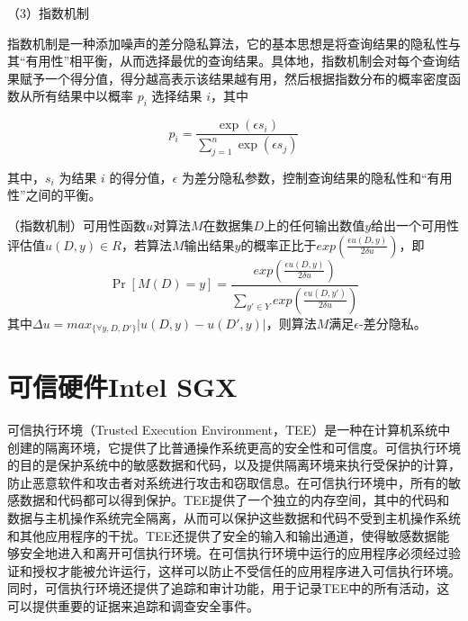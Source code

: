 %
%

（3）指数机制

指数机制是一种添加噪声的差分隐私算法，它的基本思想是将查询结果的隐私性与其“有用性”相平衡，从而选择最优的查询结果。具体地，指数机制会对每个查询结果赋予一个得分值，得分越高表示该结果越有用，然后根据指数分布的概率密度函数从所有结果中以概率 $p_i$ 选择结果 $i$，其中

$$ p_i = \frac{\exp(\epsilon s_i)}{\sum_{j=1}^{n}\exp(\epsilon s_j)} $$

其中，$s_i$ 为结果 $i$ 的得分值，$\epsilon$ 为差分隐私参数，控制查询结果的隐私性和“有用性”之间的平衡。


\begin{theorem}
	（指数机制\cite{mcsherry2007mechanism}）可用性函数$u$对算法$M$在数据集$D$上的任何输出数值$y$给出一个可用性评估值$u(D,y)\in R$，若算法$M$输出结果$y$的概率正比于$exp(\frac{\epsilon u(D,y)}{2\delta u})$，即
	\begin{equation}
		\mathop{Pr}[M(D)=y]=\frac{exp(\frac{\epsilon u(D,y)}{2\delta u})}{\sum_{y'\in Y}exp(\frac{\epsilon u(D,y')}{2\delta u})}
	\end{equation}
其中$\Delta u = max_{\{\forall y, D, D'\}}|u(D,y)-u(D',y)|$，则算法$M$满足$\epsilon$-差分隐私。
\end{theorem}

\section{可信硬件Intel SGX}


可信执行环境（Trusted Execution Environment，TEE）是一种在计算机系统中创建的隔离环境，它提供了比普通操作系统更高的安全性和可信度。可信执行环境的目的是保护系统中的敏感数据和代码，以及提供隔离环境来执行受保护的计算，防止恶意软件和攻击者对系统进行攻击和窃取信息。在可信执行环境中，所有的敏感数据和代码都可以得到保护。TEE提供了一个独立的内存空间，其中的代码和数据与主机操作系统完全隔离，从而可以保护这些数据和代码不受到主机操作系统和其他应用程序的干扰。TEE还提供了安全的输入和输出通道，使得敏感数据能够安全地进入和离开可信执行环境。在可信执行环境中运行的应用程序必须经过验证和授权才能被允许运行，这样可以防止不受信任的应用程序进入可信执行环境。同时，可信执行环境还提供了追踪和审计功能，用于记录TEE中的所有活动，这可以提供重要的证据来追踪和调查安全事件。

